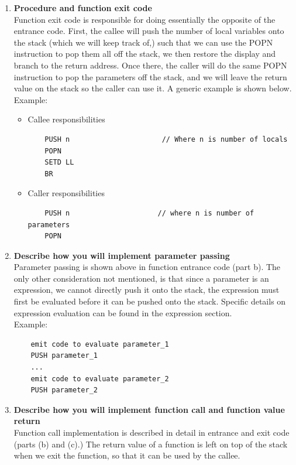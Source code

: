 \documentclass[11pt]{article}
\begin{document}
\begin{enumerate}[label=(\alph*)]
\item \textbf{Procedure and function exit code}\\
Function exit code is responsible for doing essentially the opposite of the
entrance code. First, the callee will push the number of local variables onto
the stack (which we will keep track of,) such that we can use the POPN
instruction to pop them all off the stack, we then restore the display and
branch to the return address. Once there, the caller will do the same POPN
instruction to pop the parameters off the stack, and we will leave the return
value on the stack so the caller can use it. A generic example is shown
below.\\
Example:
\begin{itemize}
\item Callee responsibilities
\begin{lstlisting}
    PUSH n                      // Where n is number of locals
    POPN
    SETD LL
    BR
\end{lstlisting}
\item Caller responsibilities
\begin{lstlisting}
    PUSH n                     // where n is number of parameters
    POPN
\end{lstlisting}
\end{itemize}

\item \textbf{Describe how you will implement parameter
passing}\\
Parameter passing is shown above in function entrance code (part b). The only other consideration not mentioned, is that since a parameter is an expression, we cannot directly push it onto the stack, the expression must first be evaluated before it can be pushed onto the stack. Specific details on expression evaluation can be found in the expression section.\\
Example:
\begin{lstlisting}
    emit code to evaluate parameter_1
    PUSH parameter_1
    ...
    emit code to evaluate parameter_2
    PUSH parameter_2
\end{lstlisting}

\item \textbf{Describe how you will implement function call
and function value return}\\
Function call implementation is described in detail in entrance and exit code
(parts (b) and (c).) The return value of a function is left on top of the stack
when we exit the function, so that it can be used by the callee.


\end{enumerate}
\end{document}

